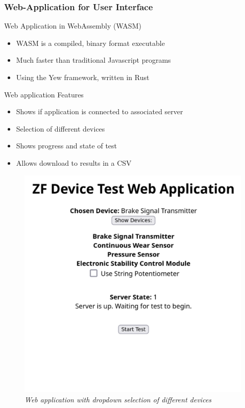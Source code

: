 \documentclass[8pt,compress,aspectratio=169]{beamer}
\begin{document}
\begin{frame}
  \frametitle{Web-Application for User Interface}
  \begin{minipage}{0.5\textwidth}
    \begin{block}{Web Application in WebAssembly (WASM)}
      \begin{itemize}
        \item WASM is a compiled, binary format executable 
        \item Much faster than traditional Javascript programs
        \item Using the Yew framework, written in Rust
      \end{itemize}
    \end{block}
    \begin{block}{Web application Features}
      \begin{itemize}
        \item Shows if application is connected to associated server
        \item Selection of different devices
        \item Shows progress and state of test
        \item Allows download to results in a CSV
      \end{itemize}
    \end{block}
  \end{minipage}
  \hfill
  \begin{minipage}{0.4\textwidth}
    \begin{figure}
      \includegraphics[width=\textwidth]{assets/misc/webapp.png}
      \caption{\it Web application with dropdown selection of different devices}
    \end{figure}
  \end{minipage}
\end{frame}
\end{document}
